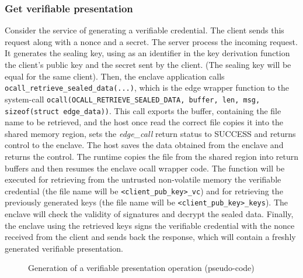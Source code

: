 \subsubsection{Get verifiable presentation}
Consider the service of generating a verifiable credential. The client sends this request along with a nonce and a secret. The server process the incoming request. It generates the sealing key, using as an identifier in the key derivation function the client's public key and the secret sent by the client. (The sealing key will be equal for the same client). Then, the enclave application calls \texttt{ocall\_retrieve\_sealed\_data(...)}, which is the edge wrapper function to the system-call \texttt{ocall(OCALL\_RETRIEVE\_SEALED\_DATA, buffer, len, msg, sizeof(struct edge\_data))}. This call exports the buffer, containing the file name to be retrieved, and the host once read the correct file copies it into the shared memory region, sets the \textit{edge\_call} return status to SUCCESS and returns control to the enclave. The host saves the data obtained from the enclave and returns the control. The runtime copies the file from the shared region into return buffers and then resumes the enclave ocall wrapper code.
The function will be executed for retrieving from the untrusted non-volatile memory the verifiable credential (the file name will be \texttt{<client\_pub\_key>\_vc}) and for retrieving the previously generated keys (the file name will be \texttt{<client\_pub\_key>\_keys}).
The enclave will check the validity of signatures and decrypt the sealed data.  
Finally, the enclave using the retrieved keys signs the verifiable credential with the nonce received from the client and sends back the response, which will contain a freshly generated verifiable presentation. 

\begin{figure}[!h]
    \centering
    
    \caption{Generation of a verifiable presentation operation (pseudo-code)}
    \label{poc-get-vp}
\end{figure}

